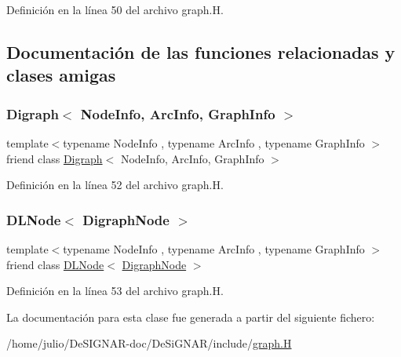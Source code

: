 Definición en la línea 50 del archivo graph.\+H.



\subsection{Documentación de las funciones relacionadas y clases amigas}
\mbox{\label{class_designar_1_1_digraph_node_abc8f370e4ec7084a6574cf967a5a5aaf}} 
\subsubsection{\texorpdfstring{Digraph$<$ Node\+Info, Arc\+Info, Graph\+Info $>$}{Digraph< NodeInfo, ArcInfo, GraphInfo >}}
{\footnotesize\ttfamily template$<$typename Node\+Info , typename Arc\+Info , typename Graph\+Info $>$ \\
friend class \hyperlink{class_designar_1_1_digraph}{Digraph}$<$ Node\+Info, Arc\+Info, Graph\+Info $>$\hspace{0.3cm}{\ttfamily [friend]}}



Definición en la línea 52 del archivo graph.\+H.

\mbox{\label{class_designar_1_1_digraph_node_a5532eb461a543edfe19acf97b74316fc}} 
\subsubsection{\texorpdfstring{D\+L\+Node$<$ Digraph\+Node $>$}{DLNode< DigraphNode >}}
{\footnotesize\ttfamily template$<$typename Node\+Info , typename Arc\+Info , typename Graph\+Info $>$ \\
friend class \hyperlink{class_designar_1_1_d_l_node}{D\+L\+Node}$<$ \hyperlink{class_designar_1_1_digraph_node}{Digraph\+Node} $>$\hspace{0.3cm}{\ttfamily [friend]}}



Definición en la línea 53 del archivo graph.\+H.



La documentación para esta clase fue generada a partir del siguiente fichero\+:\begin{DoxyCompactItemize}
\item 
/home/julio/\+De\+S\+I\+G\+N\+A\+R-\/doc/\+De\+Si\+G\+N\+A\+R/include/\hyperlink{graph_8_h}{graph.\+H}\end{DoxyCompactItemize}
